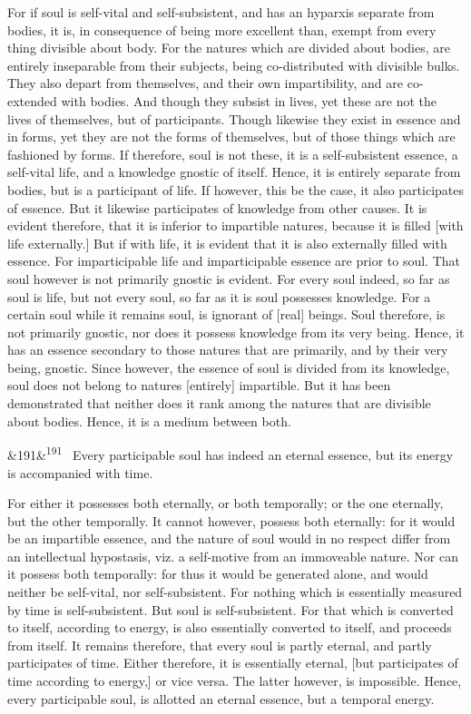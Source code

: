 \documentclass[12pt]{article}
\newcommand{\para}[1][]{\par\noindent\ifx&#1&\else\textsuperscript{\footnotesize #1}~\fi}
\begin{document}
For if soul is self-vital and self-subsistent, and has an hyparxis separate from bodies, it is, in consequence of being more excellent than, exempt from every thing divisible about body. For the natures which are divided about bodies, are entirely inseparable from their subjects, being co-distributed with divisible bulks. They also depart from themselves, and their own impartibility, and are co-extended with bodies. And though they subsist in lives, yet these are not the lives of themselves, but of participants. Though likewise they exist in essence and in forms, yet they are not the forms of themselves, but of those things which are fashioned by forms. If therefore, soul is not these, it is a self-subsistent essence, a self-vital life, and a knowledge gnostic of itself. Hence, it is entirely separate from bodies, but is a participant of life. If however, this be the case, it also participates of essence. But it likewise participates of knowledge from other causes. It is evident therefore, that it is inferior to impartible natures, because it is filled [with life externally.] But if with life, it is evident that it is also externally filled with essence. For imparticipable life and imparticipable essence are prior to soul. That soul however is not primarily gnostic is evident. For every soul indeed, so far as soul is life, but not every soul, so far as it is soul possesses knowledge. For a certain soul while it remains soul, is ignorant of [real] beings. Soul therefore, is not primarily gnostic, nor does it possess knowledge from its very being. Hence, it has an essence secondary to those natures that are primarily, and by their very being, gnostic. Since however, the essence of soul is divided from its knowledge, soul does not belong to natures [entirely] impartible. But it has been demonstrated that neither does it rank among the natures that are divisible about bodies. Hence, it is a medium between both.

\para[191] Every participable soul has indeed an eternal essence, but its energy is accompanied with time.

For either it possesses both eternally, or both temporally; or the one eternally, but the other temporally. It cannot however, possess both eternally: for it would be an impartible essence, and the nature of soul would in no respect differ from an intellectual hypostasis, viz. a self-motive from an immoveable nature. Nor can it possess both temporally: for thus it would be generated alone, and would neither be self-vital, nor self-subsistent. For nothing which is essentially measured by time is self-subsistent. But soul is self-subsistent. For that which is converted to itself, according to energy, is also essentially converted to itself, and proceeds from itself. It remains therefore, that every soul is partly eternal, and partly participates of time. Either therefore, it is essentially eternal, [but participates of time according to energy,] or vice versa. The latter however, is impossible. Hence, every participable soul, is allotted an eternal essence, but a temporal energy.
\end{document}
